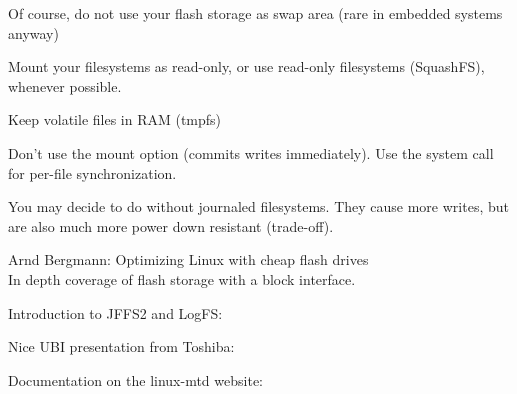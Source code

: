   \startitemize
  \item Of course, do not use your flash storage as swap area (rare in
    embedded systems anyway)
  \item Mount your filesystems as read-only, or use read-only
    filesystems (SquashFS), whenever possible.
  \item Keep volatile files in RAM (tmpfs)
  \item Don't use the  mount option (commits writes
    immediately). Use the  system call for per-file
    synchronization.
  \item You may decide to do without journaled filesystems. They cause
    more writes, but are also much more power down resistant
    (trade-off).
  \stopitemize

  \startitemize
  \item Arnd Bergmann: Optimizing Linux with cheap flash drives\\
    In depth coverage of flash storage with a block interface.\\
  \item Introduction to JFFS2 and LogFS:\\
  \item Nice UBI presentation from Toshiba:\\
  \item Documentation on the linux-mtd website:\\
  \stopitemize

